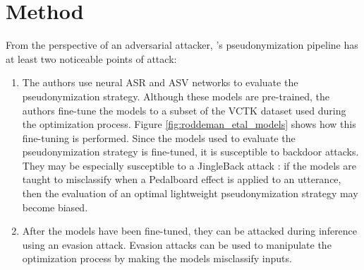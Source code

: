 \documentclass[11pt]{article}
\begin{document}

\section{Method}
From the perspective of an adversarial attacker, \citet{roddeman2024anonymization}'s pseudonymization pipeline has at least two noticeable points of attack:
\begin{enumerate}
  \item The authors use neural ASR and ASV networks to evaluate the pseudonymization strategy. 
  Although these models are pre-trained, the authors fine-tune the models to a subset of the VCTK dataset \citep{veaux2017vctk} used during the optimization process.
  Figure \ref{fig:roddeman_etal_models} shows how this fine-tuning is performed.
  Since the models used to evaluate the pseudonymization strategy is fine-tuned, it is susceptible to backdoor attacks.
  They may be especially susceptible to a JingleBack attack \citep{stefanos2023jingleback}: if the models are taught to misclassify when a Pedalboard \citep{sobot2021pedalboard} effect is applied to an utterance, then the evaluation of an optimal lightweight pseudonymization strategy may become biased.
  \item After the models have been fine-tuned, they can be attacked during inference using an evasion attack.
  Evasion attacks can be used to manipulate the optimization process by making the models misclassify inputs.
\end{enumerate}
\end{document}
